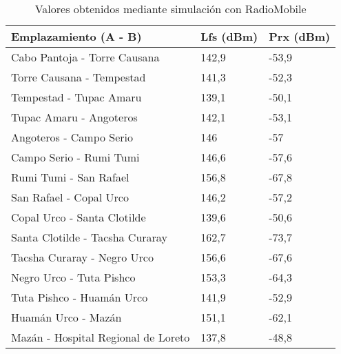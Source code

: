 \begin{table}[H]
	\begin{center}
		\begin{tabular}{|l|l|l|}
			\hline
			 Emplazamiento (A - B)  & Lfs (dBm) & Prx (dBm)\\ \hline
            Cabo Pantoja - Torre Causana & 142,9 & -53,9 \\ \hline 
		   Torre Causana - Tempestad & 141,3 & -52,3 \\ \hline
		   Tempestad - Tupac Amaru & 139,1 & -50,1 \\ \hline
		   Tupac Amaru - Angoteros & 142,1 & -53,1 \\ \hline
		   Angoteros - Campo Serio & 146 & -57 \\ \hline
		   Campo Serio - Rumi Tumi & 146,6 & -57,6 \\ \hline
		   Rumi Tumi - San Rafael & 156,8 & -67,8 \\ \hline
		   San Rafael - Copal Urco & 146,2 & -57,2 \\ \hline
		   Copal Urco - Santa Clotilde & 139,6 & -50,6 \\ \hline
		   Santa Clotilde - Tacsha Curaray & 162,7 & -73,7 \\ \hline
		   Tacsha Curaray - Negro Urco & 156,6 & -67,6 \\ \hline
		   Negro Urco - Tuta Pishco & 153,3 & -64,3 \\ \hline
		   Tuta Pishco - Huamán Urco & 141,9 & -52,9 \\ \hline
		   Huamán Urco - Mazán & 151,1 & -62,1 \\ \hline
		   Mazán - Hospital Regional de Loreto & 137,8 & -48,8 \\ \hline
		\end{tabular}
	\end{center}
	\caption{Valores obtenidos mediante simulación con RadioMobile}
	\label{table:rmEnlaceteorico}
\end{table}

